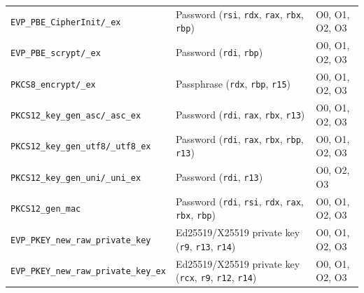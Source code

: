 \begin{table}[h]
\begin{tabular}{@{}lll@{}}
\texttt{EVP\_PBE\_CipherInit/\_ex} & Password (\texttt{rsi}, \texttt{rdx}, \texttt{rax}, \texttt{rbx}, \texttt{rbp}) & O0, O1, O2, O3 \\
\texttt{EVP\_PBE\_scrypt/\_ex} & Password (\texttt{rdi}, \texttt{rbp}) & O0, O1, O2, O3 \\
\texttt{PKCS8\_encrypt/\_ex} & Passphrase (\texttt{rdx}, \texttt{rbp}, \texttt{r15}) & O0, O1, O2, O3 \\
\texttt{PKCS12\_key\_gen\_asc/\_asc\_ex} & Password (\texttt{rdi}, \texttt{rax}, \texttt{rbx}, \texttt{r13}) & O0, O1, O2, O3 \\
\texttt{PKCS12\_key\_gen\_utf8/\_utf8\_ex} & Password (\texttt{rdi}, \texttt{rax}, \texttt{rbx}, \texttt{rbp}, \texttt{r13}) & O0, O1, O2, O3 \\
\texttt{PKCS12\_key\_gen\_uni/\_uni\_ex} & Password (\texttt{rdi}, \texttt{r13}) & O0, O2, O3 \\
\texttt{PKCS12\_gen\_mac} & Password (\texttt{rdi}, \texttt{rsi}, \texttt{rdx}, \texttt{rax}, \texttt{rbx}, \texttt{rbp}) & O0, O1, O2, O3 \\
\texttt{EVP\_PKEY\_new\_raw\_private\_key} & Ed25519/X25519 private key (\texttt{r9}, \texttt{r13}, \texttt{r14}) & O0, O1, O2, O3 \\
\texttt{EVP\_PKEY\_new\_raw\_private\_key\_ex} & Ed25519/X25519 private key (\texttt{rcx}, \texttt{r9}, \texttt{r12}, \texttt{r14}) & O0, O1, O2, O3 \\
\bottomrule
\end{tabular}
\end{table}

